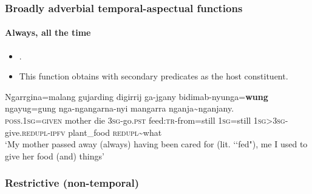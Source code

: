 \subsubsection{Broadly adverbial temporal-aspectual functions}
\paragraph{Always, all the time}
\label{exAppendixJaminjungAlways}
\begin{itemize}
	\item \textcite{SchultzeBerndt2002}.
	\item This function obtains with secondary predicates as the host constituent.
\end{itemize}
\begin{exe}
	\ex
	\gll Ngarrgina=malang gujarding digirrij ga-jgany bidimab-nyunga=\textbf{wung} ngayug=gung nga-ngangarna-nyi mangarra nganja\sim nganjany.\\
	\textsc{poss}.1\textsc{sg}=\textsc{given} mother die 3\textsc{sg}-go.\textsc{pst} feed:\textsc{tr}-from=still 1\textsc{sg}=still 1\textsc{sg}>3\textsc{sg}-give.\textsc{redupl}-\textsc{ipfv} plant\_food \textsc{redupl}\sim what\\
	\glt \lq My mother passed away (always) having been cared for (lit. \lq\lq fed"), me I used to give her food (and) things' \parencite[235]{SchultzeBerndt2002}
\end{exe}

\subsubsection{Restrictive (non-temporal)}
